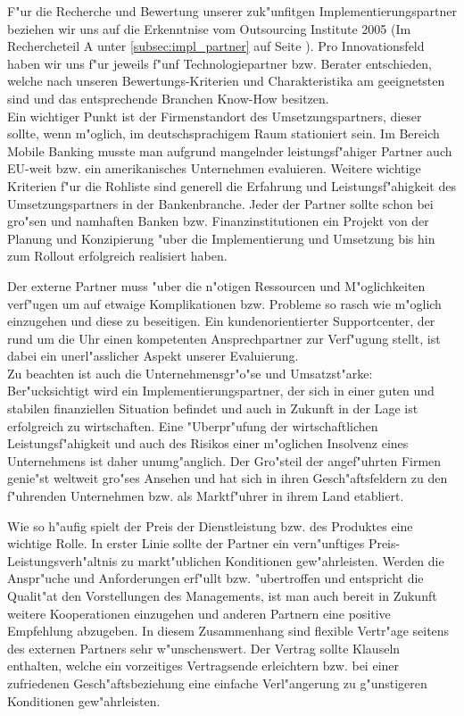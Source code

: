 F"ur die Recherche und Bewertung unserer zuk"unfitgen Implementierungspartner beziehen wir uns auf die Erkenntnise vom Outsourcing Institute 2005 (Im Rechercheteil A unter \ref{subsec:impl_partner} auf Seite \pageref{subsec:impl_partner}). Pro Innovationsfeld haben wir uns f"ur jeweils f"unf Technologiepartner bzw. Berater entschieden, welche nach unseren Bewertungs-Kriterien und Charakteristika am geeignetsten sind und das entsprechende Branchen Know-How besitzen. 
\\

Ein wichtiger Punkt ist der Firmenstandort des Umsetzungspartners, dieser sollte, wenn m"oglich, im deutschsprachigem Raum stationiert sein. Im Bereich Mobile Banking musste man aufgrund mangelnder leistungsf"ahiger Partner auch EU-weit bzw. ein amerikanisches Unternehmen evaluieren. 
Weitere wichtige Kriterien f"ur die Rohliste sind generell die Erfahrung und Leistungsf"ahigkeit des Umsetzungspartners in der Bankenbranche. Jeder der Partner sollte schon bei gro"sen und namhaften Banken bzw. Finanzinstitutionen ein Projekt von der Planung und Konzipierung "uber die Implementierung und Umsetzung bis hin zum Rollout erfolgreich realisiert haben.
 
Der externe Partner muss "uber die n"otigen Ressourcen und M"oglichkeiten verf"ugen um auf etwaige Komplikationen bzw. Probleme so rasch wie m"oglich einzugehen und diese zu beseitigen. Ein kundenorientierter Supportcenter, der rund um die Uhr einen kompetenten Ansprechpartner zur Verf"ugung stellt, ist dabei ein unerl"asslicher Aspekt unserer Evaluierung. 
\\

Zu beachten ist auch die Unternehmensgr"o"se und Umsatzst"arke: Ber"ucksichtigt wird ein Implementierungspartner, der sich in einer guten und stabilen finanziellen Situation befindet und auch in Zukunft in der Lage ist erfolgreich zu wirtschaften. Eine "Uberpr"ufung der wirtschaftlichen Leistungsf"ahigkeit und auch des Risikos einer m"oglichen Insolvenz eines Unternehmens ist daher unumg"anglich. Der Gro"steil der angef"uhrten Firmen genie"st weltweit gro"ses Ansehen und hat sich in ihren Gesch"aftsfeldern zu den f"uhrenden Unternehmen bzw. als Marktf"uhrer in ihrem Land etabliert. 

Wie so h"aufig spielt der Preis der Dienstleistung bzw. des Produktes eine wichtige Rolle. In erster Linie sollte der Partner ein vern"unftiges Preis-Leistungsverh"altnis zu markt"ublichen Konditionen gew"ahrleisten. Werden die Anspr"uche und Anforderungen erf"ullt bzw. "ubertroffen und entspricht die Qualit"at den Vorstellungen des Managements, ist man auch bereit in Zukunft weitere Kooperationen einzugehen und anderen Partnern eine positive Empfehlung abzugeben. In diesem Zusammenhang sind flexible Vertr"age seitens des externen Partners sehr w"unschenswert. Der Vertrag sollte Klauseln enthalten, welche ein vorzeitiges Vertragsende erleichtern bzw. bei einer zufriedenen Gesch"aftsbeziehung eine einfache Verl"angerung zu g"unstigeren Konditionen gew"ahrleisten. 